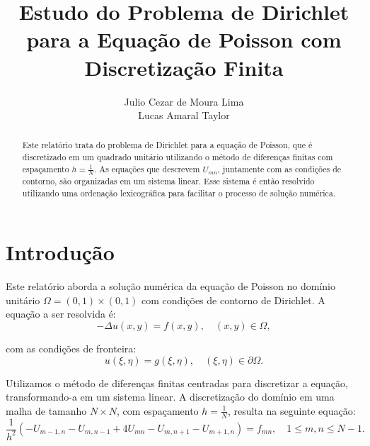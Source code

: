 \documentclass[column,amsmath,amssymb,floatfix]{revtex4}
\begin{document}
\title{Estudo do Problema de Dirichlet para a Equação de Poisson com Discretização Finita}
\author{Julio Cezar de Moura Lima \\ Lucas Amaral Taylor}

\begin{abstract}
    \baselineskip 11pt
    \begin{center}
        Este relatório trata do problema de Dirichlet para a equação de Poisson, que é discretizado em um quadrado unitário utilizando o método de diferenças finitas com espaçamento $h = \frac{1}{N}$. As equações que descrevem $U_{mn}$, juntamente com as condições de contorno, são organizadas em um sistema linear. Esse sistema é então resolvido utilizando uma ordenação lexicográfica para facilitar o processo de solução numérica.
    \end{center}
\end{abstract}


\maketitle

    \section{Introdução}
        Este relatório aborda a solução numérica da equação de Poisson no domínio unitário $\Omega = (0,1) \times (0,1)$ com condições de contorno de Dirichlet. A equação a ser resolvida é:
        \begin{equation*}
             -\Delta u(x, y) = f(x, y), \quad (x, y) \in \Omega, 
        \end{equation*}
    
        com as condições de fronteira:
        \begin{equation*}
            u(\xi, \eta) = g(\xi, \eta), \quad (\xi, \eta) \in \partial\Omega.
        \end{equation*}
        
        Utilizamos o método de diferenças finitas centradas para discretizar a equação, transformando-a em um sistema linear. A discretização do domínio em uma malha de tamanho $N \times N$, com espaçamento $h = \frac{1}{N}$, resulta na seguinte equação:
        \begin{equation*}
            \frac{1}{h^2}(-U_{m-1,n} - U_{m,n-1} + 4U_{mn} - U_{m,n+1} - U_{m+1,n}) = f_{mn}, \quad 1 \leq m,n \leq N-1.
        \end{equation*}
    
\end{document}
